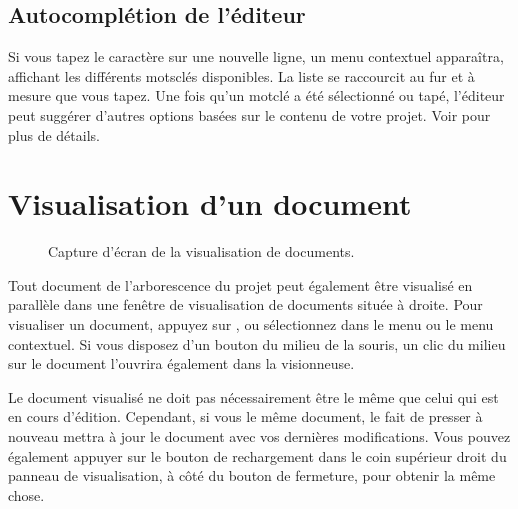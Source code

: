 \documentclass[a4paper,11pt,french]{sphinxmanual}
\begin{document}
\subsection{Auto\sphinxhyphen{}complétion de l’éditeur}
\label{\detokenize{usage_writing:editor-auto-completer}}
\sphinxAtStartPar
Si vous tapez le caractère  sur une nouvelle ligne, un menu contextuel apparaîtra, affichant les différents mots\sphinxhyphen{}clés disponibles. La liste se raccourcit au fur et à mesure que vous tapez. Une fois qu’un mot\sphinxhyphen{}clé a été sélectionné ou tapé, l’éditeur peut suggérer d’autres options basées sur le contenu de votre projet. Voir {\hyperref[\detokenize{project_references:a-references-completer}]{}} pour plus de détails.

\sphinxAtStartPar
{}


\section{Visualisation d’un document}
\label{\detokenize{usage_writing:viewing-a-document}}\label{\detokenize{usage_writing:a-ui-view}}
\begin{figure}[htbp]
\centering
\capstart

\noindent{}
\caption{Capture d’écran de la visualisation de documents.}\label{\detokenize{usage_writing:id2}}\end{figure}

\sphinxAtStartPar
Tout document de l’arborescence du projet peut également être visualisé en parallèle dans une fenêtre de visualisation de documents située à droite. Pour visualiser un document, appuyez sur , ou sélectionnez  dans le menu ou le menu contextuel. Si vous disposez d’un bouton du milieu de la souris, un clic du milieu sur le document l’ouvrira également dans la visionneuse.

\sphinxAtStartPar
Le document visualisé ne doit pas nécessairement être le même que celui qui est en cours d’édition. Cependant, si vous  le même document, le fait de presser  à nouveau mettra à jour le document avec vos dernières modifications. Vous pouvez également appuyer sur le bouton de rechargement dans le coin supérieur droit du panneau de visualisation, à côté du bouton de fermeture, pour obtenir la même chose.
\end{document}
